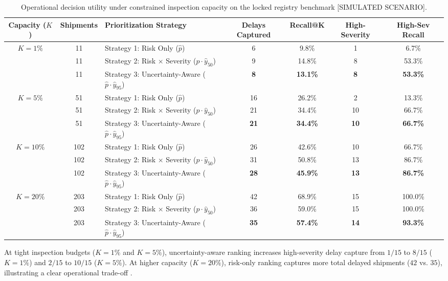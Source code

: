 \documentclass[11pt,a4paper]{article}
\begin{document}
\begin{table}[htbp]
\centering
\caption{Operational decision utility under constrained inspection capacity on the locked registry benchmark [SIMULATED SCENARIO].}
\label{tab:decision_utility}
\small
\begin{tabular}{cclcccc}
\toprule
\textbf{Capacity ($K$)} & \textbf{Shipments} & \textbf{Prioritization Strategy} & \textbf{Delays Captured} & \textbf{Recall@K} & \textbf{High-Severity} & \textbf{High-Sev Recall} \\
\midrule
$K = 1\%$ & 11 & Strategy 1: Risk Only ($\hat{p}$) & 6 & 9.8\% & 1 & 6.7\% \\
 & 11 & Strategy 2: Risk $\times$ Severity ($\hat{p} \cdot \hat{y}_{50}$) & 9 & 14.8\% & 8 & 53.3\% \\
 & 11 & Strategy 3: Uncertainty-Aware ($\hat{p} \cdot \hat{y}_{95}$) & \textbf{8} & \textbf{13.1\%} & \textbf{8} & \textbf{53.3\%} \\
\midrule
$K = 5\%$ & 51 & Strategy 1: Risk Only ($\hat{p}$) & 16 & 26.2\% & 2 & 13.3\% \\
 & 51 & Strategy 2: Risk $\times$ Severity ($\hat{p} \cdot \hat{y}_{50}$) & 21 & 34.4\% & 10 & 66.7\% \\
 & 51 & Strategy 3: Uncertainty-Aware ($\hat{p} \cdot \hat{y}_{95}$) & \textbf{21} & \textbf{34.4\%} & \textbf{10} & \textbf{66.7\%} \\
\midrule
$K = 10\%$ & 102 & Strategy 1: Risk Only ($\hat{p}$) & 26 & 42.6\% & 10 & 66.7\% \\
 & 102 & Strategy 2: Risk $\times$ Severity ($\hat{p} \cdot \hat{y}_{50}$) & 31 & 50.8\% & 13 & 86.7\% \\
 & 102 & Strategy 3: Uncertainty-Aware ($\hat{p} \cdot \hat{y}_{95}$) & \textbf{28} & \textbf{45.9\%} & \textbf{13} & \textbf{86.7\%} \\
\midrule
$K = 20\%$ & 203 & Strategy 1: Risk Only ($\hat{p}$) & 42 & 68.9\% & 15 & 100.0\% \\
 & 203 & Strategy 2: Risk $\times$ Severity ($\hat{p} \cdot \hat{y}_{50}$) & 36 & 59.0\% & 15 & 100.0\% \\
 & 203 & Strategy 3: Uncertainty-Aware ($\hat{p} \cdot \hat{y}_{95}$) & \textbf{35} & \textbf{57.4\%} & \textbf{14} & \textbf{93.3\%} \\
\bottomrule
\end{tabular}
\end{table}

At tight inspection budgets ($K = 1\%$ and $K = 5\%$), uncertainty-aware ranking increases high-severity delay capture from $1/15$ to $8/15$ ($K=1\%$) and $2/15$ to $10/15$ ($K=5\%$). At higher capacity ($K=20\%$), risk-only ranking captures more total delayed shipments ($42$ vs. $35$), illustrating a clear operational trade-off \cite{bastani2021efficient}.
\end{document}

